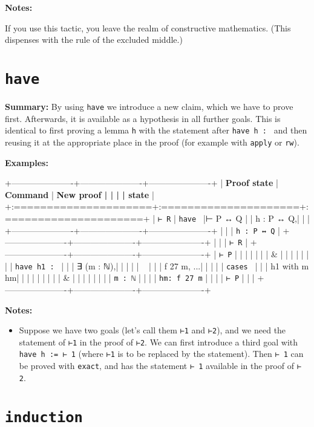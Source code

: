 \documentclass{memoir}
\begin{document}
\textbf{Notes:}

If you use this tactic, you leave the realm of constructive mathematics. (This dispenses with the rule of the excluded middle.)




\section{\Verb|have|}

\textbf{Summary:} By using \Verb|have| we introduce a new claim, which we have to prove first. Afterwards, it is available as a hypothesis in all further goals. This is identical to first proving a lemma \Verb|h| with the statement after \Verb|have h : | and then reusing it at the appropriate place in the proof (for example with \Verb|apply| or \Verb|rw|).

\textbf{Examples:}

+----------------------+----------------------+----------------------+
| \textbf{Proof state} | \textbf{Command} | \textbf{New proof |
| | | state} |
+:=====================+:=====================+:=====================+
| \Verb|⊢ R| | \Verb|have | |⊢ P ↔ Q\Verb||
| | h : P ↔ Q,| | |
+----------------------+----------------------+----------------------+
| | | \Verb|h : P ↔ Q| |
+----------------------+----------------------+----------------------+
| | | \Verb|⊢ R| |
+----------------------+----------------------+----------------------+
| \Verb|⊢ P| | | |
| | |
| & | | |
| | | |
| \Verb|have h1 : | | |
| ∃ (m : ℕ),| | | |
| \Verb| | | |
| f 27 m, ...| | | |
| \Verb|cases | | |
| h1 with m hm| | | |
| | | |
| & | | |
| | | |
| \Verb|m : ℕ| | | |
| \Verb|hm: f 27 m| | | |
| \Verb|⊢ P| | | |
+----------------------+----------------------+----------------------+

\textbf{Notes:}

\begin{itemize}
\item Suppose we have two goals (let's call them \Verb|⊢1| and \Verb|⊢2|), and we need the statement of \Verb|⊢1| in the proof of \Verb|⊢2|. We can first introduce a third goal with \Verb|have h := ⊢ 1| (where \Verb|⊢1| is to be replaced by the statement). Then \Verb|⊢ 1| can be proved with \Verb|exact|, and has the statement \Verb|⊢ 1| available in the proof of \Verb|⊢ 2|.

\end{itemize}




\section{\Verb|induction|}
\end{document}

